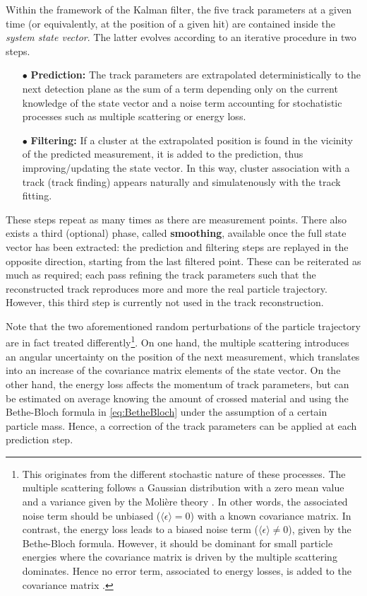 Within the framework of the Kalman filter, the five track parameters at a given time (or equivalently, at the position of a given hit) are contained inside the \textit{system state vector}. The latter evolves according to an iterative procedure in two steps. 
\begin{itemize}
\item[$\bullet$] \textbf{Prediction:} The track parameters are extrapolated deterministically to the next detection plane as the sum of a term depending only on the current knowledge of the state vector and a noise term accounting for stochatistic processes such as multiple scattering or energy loss.
\item[$\bullet$] \textbf{Filtering:} If a cluster at the extrapolated position is found in the vicinity of the predicted measurement, it is added to the prediction, thus improving/updating the state vector. In this way, cluster association with a track (track finding) appears naturally and simulatenously with the track fitting.
\end{itemize}
These steps repeat as many times as there are measurement points. There also exists a third (optional) phase, called \textbf{smoothing}, available once the full state vector has been extracted: the prediction and filtering steps are replayed in the opposite direction, starting from the last filtered point. These can be reiterated as much as required; each pass refining the track parameters such that the reconstructed track reproduces more and more the real particle trajectory. However, this third step is currently not used in the track reconstruction.

Note that the two aforementioned random perturbations of the particle trajectory are in fact treated differently\footnote{This originates from the different stochastic nature of these processes. The multiple scattering follows a Gaussian distribution with a zero mean value and a variance given by the Molière theory \cite{particledatagroupReviewParticlePhysics2022}. In other words, the associated noise term should be unbiased ($\langle \epsilon \rangle = 0 $) with a known covariance matrix. In contrast, the energy loss leads to a biased noise term ($\langle \epsilon \rangle \neq 0 $), given by the Bethe-Bloch formula. However, it should be dominant for small particle energies where the covariance matrix is driven by the multiple scattering dominates. Hence no error term, associated to energy losses, is added to the covariance matrix \cite{mankelPatternRecognitionEvent2004}.}. On one hand, the multiple scattering introduces an angular uncertainty on the position of the next measurement, which translates into an increase of the covariance matrix elements of the state vector. On the other hand, the energy loss affects the momentum of track parameters, but can be estimated on average knowing the amount of crossed material and using the Bethe-Bloch formula in \eq\ref{eq:BetheBloch} under the assumption of a certain particle mass. Hence, a \dEdx correction of the track parameters can be applied at each prediction step. \\

